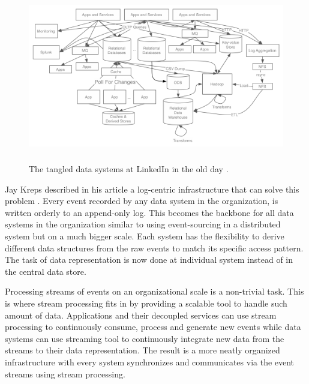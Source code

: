 \begin{figure}[h]
	\includegraphics[width=\linewidth,height=7.5cm]{images/linkedin-data-flow-ugly.png}
	\caption{The tangled data systems at LinkedIn in the old day \cite{eventstreamingplatform}.}
	\label{fig:tangledsystem}
\end{figure}

Jay Kreps described in his article a log-centric infrastructure that can solve this problem \cite{logjaykreps}. Every event recorded by any data system in the organization, is written orderly to an append-only log. This becomes the backbone for all data systems in the organization similar to using event-sourcing in a distributed system but on a much bigger scale. Each system has the flexibility to derive different data structures from the raw events to match its specific access pattern. The task of data representation is now done at individual system instead of in the central data store. 



Processing streams of events on an organizational scale is a non-trivial task. This is where stream processing fits in by providing a scalable tool to handle such amount of data. Applications and their decoupled services can use stream processing to continuously consume, process and generate new events while data systems can use streaming tool to continuously integrate new data from the streams to their data representation. The result is a more neatly organized infrastructure with every system synchronizes and communicates via the event streams using stream processing. 

